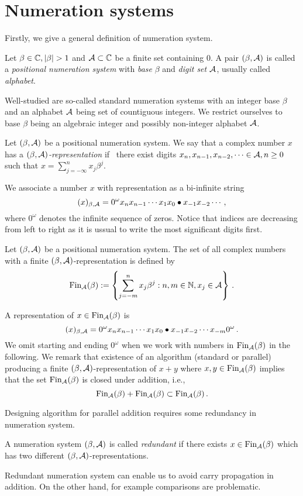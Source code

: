 \section{Numeration systems}
Firstly, we give a general definition of numeration system.
\begin{defn}
  Let $\beta \in \CC, |\beta|>1$ and $\mathcal{A} \subset \mathbb{C}$ be a finite set containing 0. A pair $(\beta, \mathcal{A})$ is called a \emph{positional numeration system} with \emph{base} $\beta$ and \emph{digit set} $\mathcal{A}$, usually called \emph{alphabet}.
\end{defn}
Well-studied are so-called standard numeration systems with an integer base $\beta$ and an alphabet $\mathcal{A}$ being set of countiguous integers. We restrict ourselves to base $\beta$ being an algebraic integer and possibly non-integer alphabet $\mathcal{A}$. 
\begin{defn}
Let $(\beta, \mathcal{A})$ be a positional numeration system.  We say that a complex number $x$ has a \emph{$(\beta, \mathcal{A})$-representation} if~ there exist digits $x_n,x_{n-1}, x_{n-2},\dots \in\mathcal{A}, n\geq 0$ such that $x=\sum_{j=-\infty}^n x_j \beta^j$.
\end{defn}
We associate a number $x$ with representation as a bi-infinite string 
  $$
    (x)_{\beta,\mathcal{A}}=0^\omega x_n x_{n-1}\cdots x_1 x_0 \bullet x_{-1} x_{-2} \cdots\,,
  $$
  where $0^\omega$ denotes the infinite sequence of zeros. Notice that indices are decreasing from left to right as it is ussual to write the most significant digits first. 

\begin{defn}
Let $(\beta, \mathcal{A})$ be a positional numeration system. The set of all complex numbers with a finite $(\beta, \mathcal{A})$-representation is defined by
$$
    \text{Fin}_{\mathcal{A}}(\beta):=\left\{\sum_{j=-m}^n x_j \beta^j : n, m \in \mathbb{N}, x_j \in \mathcal{A} \right\}\,.
$$
\end{defn}
A representation of $x\in\text{Fin}_{\mathcal{A}}(\beta)$ is 
$$
(x)_{\beta,\mathcal{A}}= 0^\omega x_n x_{n-1}\cdots x_1 x_0 \bullet x_{-1} x_{-2} \cdots x_{-m} 0^\omega\,.
$$ 
We omit starting and ending $0^\omega$ when we work with numbers in $\text{Fin}_{\mathcal{A}}(\beta)$ in the following. We remark that existence of an algorithm (standard or parallel) producing a finite $(\beta,\mathcal{A})$-representation of $x+y$ where $x,y\in\text{Fin}_{\mathcal{A}}(\beta)$ implies that the set $\text{Fin}_{\mathcal{A}}(\beta)$ is closed under addition, i.e.,
$$
\text{Fin}_{\mathcal{A}}(\beta) + \text{Fin}_{\mathcal{A}}(\beta) \subset \text{Fin}_{\mathcal{A}}(\beta)\,.
$$ 

Designing algorithm for parallel addition requires some redundancy in numeration system. 
\begin{defn}
A numeration system $(\beta,\mathcal{A})$ is called \emph{redundant} if there exists $x \in \text{Fin}_{\mathcal{A}}(\beta)$ which has two different $(\beta,\mathcal{A})$-representations.
\end{defn}
Redundant numeration system can enable us to avoid carry propagation in addition. On the other hand, for example comparisons are problematic.  


